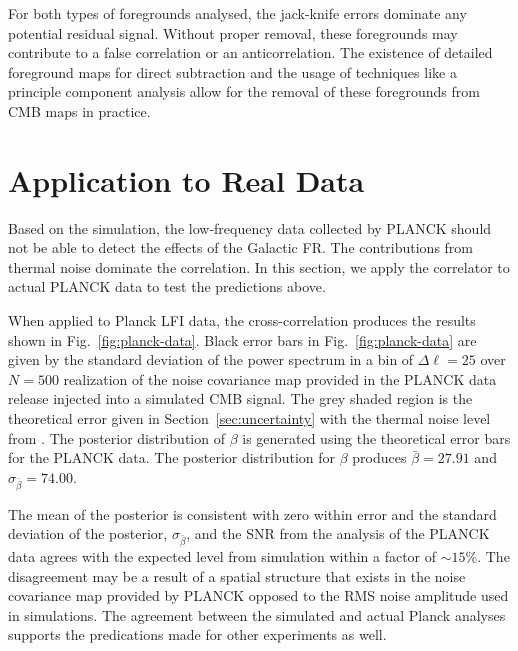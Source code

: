 \documentclass[usenatbib,hidelinks]{mnras}
\begin{document}
{For both types of foregrounds analysed, the jack-knife errors dominate any potential residual signal. Without proper removal, these foregrounds may contribute to a false correlation or an anticorrelation. The existence of detailed foreground maps for direct subtraction and the usage of techniques like a principle component analysis allow for the removal of these foregrounds from CMB maps in practice.
}
 





\section{Application to Real Data}\label{sec:real-data}{
Based on the simulation, the low-frequency data collected by PLANCK should not be able to detect the effects of the Galactic FR. The contributions from thermal noise dominate the correlation.
In this section, we apply the correlator to actual PLANCK data to test the predictions above.

 

When applied to Planck LFI data, the cross-correlation produces the results
 shown in Fig.~\ref{fig:planck-data}. Black error bars in Fig.~\ref{fig:planck-data} are given by the standard deviation of the power spectrum in a bin of $\Delta \ell =25$ over $N=500$ realization of the noise covariance map provided in the PLANCK data release injected into a simulated CMB signal.
The grey shaded region is the theoretical error given in Section~\ref{sec:uncertainty} with the thermal noise level from \cite{planck:2015i}.
 The posterior distribution of $\beta$ is generated using the theoretical error bars for the PLANCK data. 
  The posterior distribution for $\beta$ produces $\bar{\beta}=27.91$ and $\sigma_{\bar{\beta}}=74.00$.
  

  
  
 The mean of the posterior is consistent with zero within error and the standard deviation of the posterior, $\sigma_{\bar{\beta}}$, and the SNR from the analysis of the PLANCK data agrees with the expected level from simulation within a factor of $\sim 15\%$. The disagreement may be a result of a spatial structure that exists in the noise covariance map provided by PLANCK opposed to the RMS noise amplitude used in simulations.
The agreement between the simulated and actual Planck analyses supports the predications made for other experiments as well.

}
\end{document}
